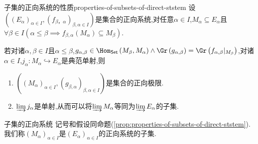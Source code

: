 \begin{proposition}{子集的正向系统的性质}{properties-of-subsets-of-direct-ststem}
	设$\left(\left(E_{\alpha}\right)_{\alpha\in I},\left(f_{\beta，\alpha}\right)_{\beta,\alpha\in I}\right)$是集合的正向系统,对任意$\alpha\in I$,$M_{\alpha}\subseteq E_{\alpha}$且$\forall\beta\in I\left(\alpha\leq\beta\implies f_{\beta,\alpha}\left(M_{\alpha}\right)\subseteq M_{\beta}\right)$.
	
	若对诸$\alpha,\beta\in I$且$\alpha\leq\beta$,$g_{\alpha,\beta}\in\Hom_{\mathsf{Set}}\left(M_{\beta},M_{\alpha}\right)\wedge\Gr\left(g_{\alpha,\beta}\right)=\Gr\left(f_{\alpha,\beta}|_{M_{\beta}}\right)$,对诸$\alpha\in I$,$j_{\alpha}:M_{\alpha}\hookrightarrow E_{\alpha}$是典范单射,则
	\begin{enumerate}
		\item $\left(\left(M_{\alpha}\right)_{\alpha\in I},\left(g_{\beta,\alpha}\right)_{\beta,\alpha\in I}\right)$是集合的正向极限.
		\item $\varinjlim j_{\alpha}$是单射,从而可以将$\varinjlim M_{\alpha}$等同为$\varinjlim E_{\alpha}$的子集.
	\end{enumerate}
\end{proposition}

\begin{definition}{子集的正向系统}{}
	记号和假设同命题(\cref{prop:properties-of-subsets-of-direct-ststem}).我们称$\left(M_{\alpha}\right)_{\alpha\in I}$是$\left(E_{\alpha}\right)_{\alpha\in I}$的正向系统的子集.
\end{definition}

